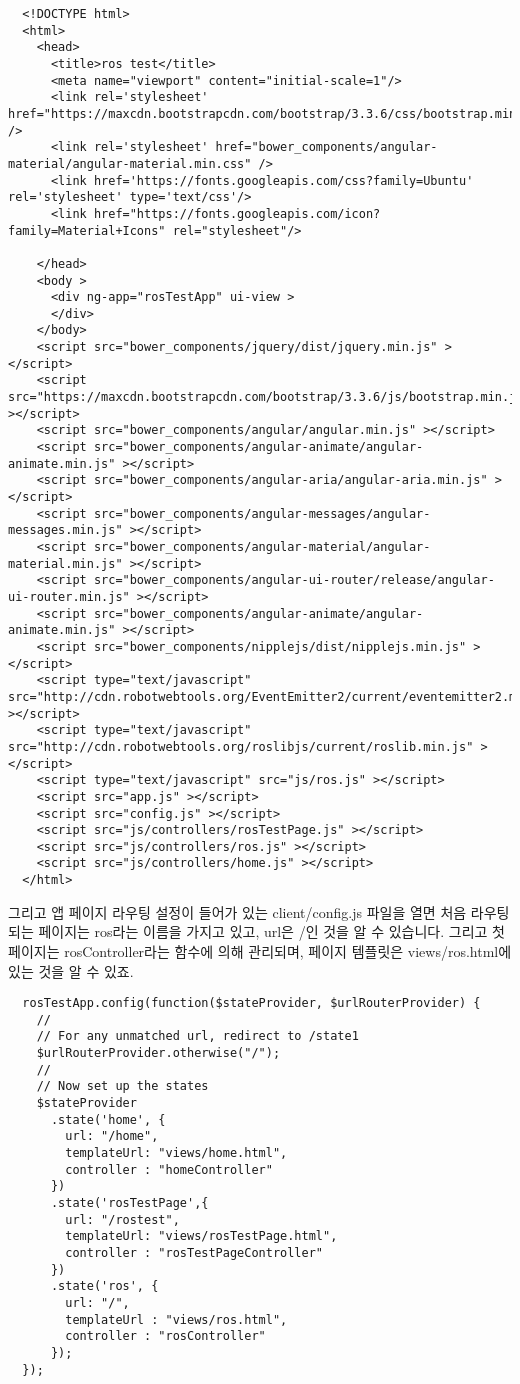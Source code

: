 \documentclass[11pt,fleqn]{book} %
\begin{document}
\begin{verbatim}
  <!DOCTYPE html>
  <html>
    <head>
      <title>ros test</title>
      <meta name="viewport" content="initial-scale=1"/>
      <link rel='stylesheet' href="https://maxcdn.bootstrapcdn.com/bootstrap/3.3.6/css/bootstrap.min.css" />
      <link rel='stylesheet' href="bower_components/angular-material/angular-material.min.css" />
      <link href='https://fonts.googleapis.com/css?family=Ubuntu' rel='stylesheet' type='text/css'/>
      <link href="https://fonts.googleapis.com/icon?family=Material+Icons" rel="stylesheet"/>

    </head>
    <body >
      <div ng-app="rosTestApp" ui-view >
      </div>
    </body>
    <script src="bower_components/jquery/dist/jquery.min.js" ></script>
    <script src="https://maxcdn.bootstrapcdn.com/bootstrap/3.3.6/js/bootstrap.min.js" ></script>
    <script src="bower_components/angular/angular.min.js" ></script>
    <script src="bower_components/angular-animate/angular-animate.min.js" ></script>
    <script src="bower_components/angular-aria/angular-aria.min.js" ></script>
    <script src="bower_components/angular-messages/angular-messages.min.js" ></script>
    <script src="bower_components/angular-material/angular-material.min.js" ></script>
    <script src="bower_components/angular-ui-router/release/angular-ui-router.min.js" ></script>
    <script src="bower_components/angular-animate/angular-animate.min.js" ></script>
    <script src="bower_components/nipplejs/dist/nipplejs.min.js" ></script>
    <script type="text/javascript" src="http://cdn.robotwebtools.org/EventEmitter2/current/eventemitter2.min.js" ></script>
    <script type="text/javascript" src="http://cdn.robotwebtools.org/roslibjs/current/roslib.min.js" ></script>
    <script type="text/javascript" src="js/ros.js" ></script>
    <script src="app.js" ></script>
    <script src="config.js" ></script>
    <script src="js/controllers/rosTestPage.js" ></script>
    <script src="js/controllers/ros.js" ></script>
    <script src="js/controllers/home.js" ></script>
  </html>

\end{verbatim}

그리고 앱 페이지 라우팅 설정이 들어가 있는 client/config.js 파일을 열면 처음 라우팅 되는 페이지는 ros라는 이름을 가지고 있고, url은 /인 것을 알 수 있습니다.
그리고 첫 페이지는 rosController라는 함수에 의해 관리되며, 페이지 템플릿은 views/ros.html에 있는 것을 알 수 있죠.

\begin{verbatim}
  rosTestApp.config(function($stateProvider, $urlRouterProvider) {
    //
    // For any unmatched url, redirect to /state1
    $urlRouterProvider.otherwise("/");
    //
    // Now set up the states
    $stateProvider
      .state('home', {
        url: "/home",
        templateUrl: "views/home.html",
        controller : "homeController"
      })
      .state('rosTestPage',{
        url: "/rostest",
        templateUrl: "views/rosTestPage.html",
        controller : "rosTestPageController"
      })
      .state('ros', {
        url: "/",
        templateUrl : "views/ros.html",
        controller : "rosController"
      });
  });
\end{verbatim}
\end{document}
